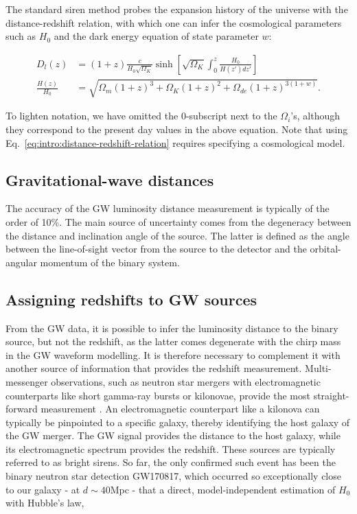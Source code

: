 \documentclass[%
preprint,
 amsmath,amssymb,
 aps,
]{revtex4-2}
\begin{document}
The standard siren method probes the expansion history of the universe with the distance-redshift
relation, with which one can infer the cosmological parameters such as $H_0$ and the dark energy
equation of state parameter $w$:~\cite{Hogg:1999ad}

\begin{align}
	\label{eq:intro:distance-redshift-relation}
	D_l(z)           & = (1+z)\frac{c}{H_0 \sqrt{\Omega_{K}}} \sinh \left[ \sqrt{\Omega_{K}} \int_0^z \frac{H_0}{H(z') dz'}\right] \\
	\nonumber
	\frac{H(z)}{H_0} & = \sqrt{\Omega_m (1+z)^3 + \Omega_K (1+z)^2 + \Omega_{de} (1+z)^{3(1+w)}}.
\end{align}

To lighten notation, we have omitted the 0-subscript next to the $\Omega_i$'s, although they
correspond to the present day values in the above equation. Note that using
Eq.~\eqref{eq:intro:distance-redshift-relation} requires specifying a cosmological model.

\subsection{Gravitational-wave distances}

The accuracy of the GW luminosity distance measurement is typically of the order of 10\%. The main
source of uncertainty comes from the degeneracy between the distance and inclination angle of the
source. The latter is defined as the angle between the line-of-sight vector from the source to the
detector and the orbital-angular momentum of the binary system.

\subsection{Assigning redshifts to GW sources}

From the GW data, it is possible to infer the luminosity distance to the binary source, but not the
redshift, as the latter comes degenerate with the chirp mass in the GW waveform modelling. It is
therefore necessary to complement it with another source of information that provides the redshift
measurement. Multi-messenger observations, such as neutron star mergers with electromagnetic
counterparts like short gamma-ray bursts or kilonovae, provide the most straight-forward
measurement \cite{Holz:2005df,Dalal:2006qt}. An electromagnetic counterpart like a kilonova can
typically be pinpointed to a specific galaxy, thereby identifying the host galaxy of the GW merger.
The GW signal provides the distance to the host galaxy, while its electromagnetic spectrum provides
the redshift. These sources are typically referred to as bright sirens. So far, the only confirmed
such event has been the binary neutron star detection GW170817, which occurred so exceptionally
close to our galaxy - at $d \sim 40$Mpc - that a direct, model-independent estimation of $H_0$ with
Hubble's law,
\end{document}
